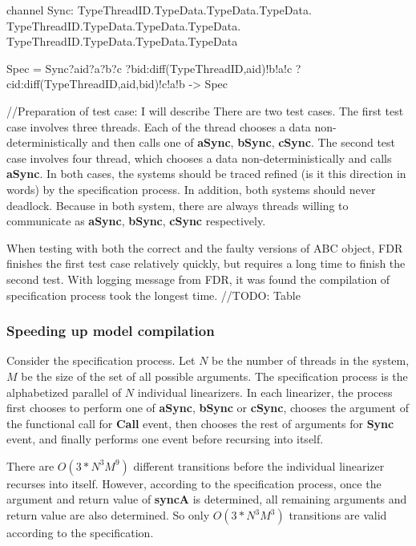 \documentclass{article}
\begin{document}
\begin{cspm}
channel Sync: TypeThreadID.TypeData.TypeData.TypeData.
              TypeThreadID.TypeData.TypeData.TypeData.
              TypeThreadID.TypeData.TypeData.TypeData

Spec = Sync?aid?a?b?c
           ?bid:diff(TypeThreadID,{aid})!b!a!c
           ?cid:diff(TypeThreadID,{aid,bid})!c!a!b 
    -> Spec
\end{cspm}

//Preparation of test case: I will describe 
There are two test cases. The first test case involves three threads. Each of the thread chooses a data non-deterministically and then calls one of \textbf{aSync}, \textbf{bSync}, \textbf{cSync}. The second test case involves four thread, which chooses a data non-deterministically and calls \textbf{aSync}. In both cases, the systems should be traced refined (is it this direction in words) by the specification process. In addition, both systems should never deadlock. Because in both system, there are always threads willing to communicate as \textbf{aSync}, \textbf{bSync}, \textbf{cSync} respectively.

When testing with both the correct and the faulty versions of ABC object, FDR finishes the first test case relatively quickly, but requires a long time to finish the second test. With logging message from FDR, it was found the compilation of specification process took the longest time. 
//TODO: Table

\subsubsection{Speeding up model compilation}
Consider the specification process. Let $N$ be the number of threads in the system, $M$ be the size of the set of all possible arguments. The specification process is the alphabetized parallel of $N$ individual linearizers. In each linearizer, the process first chooses to perform one of \textbf{aSync}, \textbf{bSync} or \textbf{cSync}, chooses the argument of the functional call for \textbf{Call} event, then chooses the rest of arguments for \textbf{Sync} event, and finally performs one event before recursing into itself.

There are $O(3*N^3M^9)$ different transitions before the individual linearizer recurses into itself. However, according to the specification process, once the argument and return value of \textbf{syncA} is determined, all remaining arguments and return value are also determined. So only $O(3*N^3M^3)$ transitions are valid according to the specification. 
\end{document}
